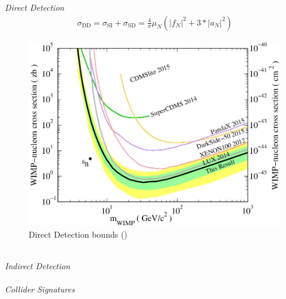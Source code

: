 \textit{Direct Detection} \\
\begin{align}
 \sigma_\text{DD} = \sigma_\text{SI} + \sigma_\text{SD} = \frac{4}{\pi}\mu_N \left(|f_N|^2 + 3*|a_N|^2\right)
 \label{eq_th.sigma.dd}
\end{align}
\begin{figure}[t]
 \includegraphics[width=\textwidth]{../pics/ddLux.jpeg}
 \caption{Direct Detection bounds (\cite{1512.03506})}
 \label{pic_ddbounds}
\end{figure}
\\ \textit{Indirect Detection} \\
\\ \textit{Collider Signatures}